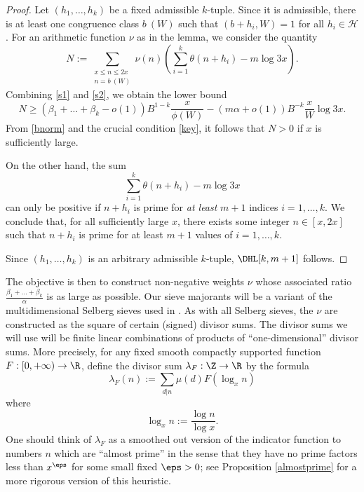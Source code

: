 \begin{proof}
Let $(h_1,\ldots,h_{k})$ be a fixed
  admissible $k$-tuple.  Since it is admissible, there is at least
  one congruence class $b\ (W)$ such that $(b+h_i,W)=1$ for all $h_i
  \in {\mathcal H}$.  For an arithmetic function $\nu$ as in the
  lemma, we consider the quantity
$$
N:=\sum_{\substack{x \leq n \leq 2x\\ n = b\ (W)}}
 \nu(n) \left(\sum_{i=1}^{k} \theta(n+h_i) - m\log 3x\right).
$$
Combining \eqref{s1} and \eqref{s2}, we obtain the lower bound
$$ 
N\geq (\beta_1+\dots+\beta_k-o(1)) B^{1-k} \frac{x}{\phi(W)} - (m\alpha+o(1)) B^{-k} \frac{x}{W} \log 3x.
$$ 
From \eqref{bnorm} and the crucial condition \eqref{key}, it follows that
$N>0$ if $x$ is sufficiently large.
\par
On the other hand, the sum
$$
\sum_{i=1}^{k} \theta(n+h_i) - m\log 3x
$$ 
can only be positive if $n+h_i$ is prime for \emph{at least} $m+1$
indices $i=1, \ldots, k$.  We conclude that, for all sufficiently
large $x$, there exists some integer $n \in [x,2x]$ such that $n+h_i$
is prime for at least $m+1$ values of $i=1,\ldots,k$. 
\par
Since $(h_1,\dots,h_k)$ is an arbitrary admissible $k$-tuple,
$\DHL[k,m+1]$ follows.
\end{proof}

The objective is then to construct non-negative weights $\nu$ whose associated ratio $\frac{\beta_1+\dots+\beta_k}{\alpha}$ is as large as possible.   Our sieve majorants will be a variant of the multidimensional Selberg sieves used in \cite{maynard-new}.  As with all Selberg sieves, the $\nu$ are constructed as the square of certain (signed) divisor sums.  The divisor sums we will use will be finite linear combinations of products of ``one-dimensional'' divisor sums.  More precisely, for any fixed smooth compactly supported function $F: [0,+\infty) \to \R$, define the divisor sum $\lambda_F: \Z \to \R$ by the formula
\begin{equation}\label{lambdaf-def}
\lambda_F(n) := \sum_{d|n} \mu(d) F( \log_x n )
\end{equation}
where
\begin{equation}\label{logx-def}
\log_x n:= \frac{\log n}{\log x}.
\end{equation}
One should think of $\lambda_F$ as a smoothed out version of the indicator function to numbers $n$ which are ``almost prime'' in the sense that they have no prime factors less than $x^\eps$ for some small fixed $\eps>0$; see Proposition \ref{almostprime} for a more rigorous version of this heuristic.

